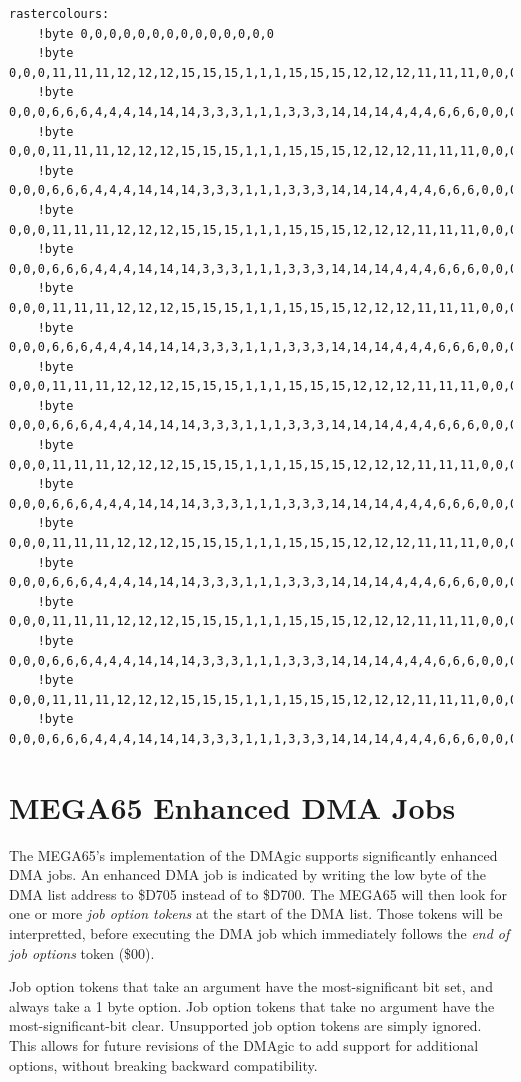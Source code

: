 \begin{tcolorbox}[colback=black,coltext=white]
\verbatimfont{\codefont}
\begin{verbatim}
rastercolours:
	!byte 0,0,0,0,0,0,0,0,0,0,0,0,0,0
	!byte 0,0,0,11,11,11,12,12,12,15,15,15,1,1,1,15,15,15,12,12,12,11,11,11,0,0,0
	!byte 0,0,0,6,6,6,4,4,4,14,14,14,3,3,3,1,1,1,3,3,3,14,14,14,4,4,4,6,6,6,0,0,0
	!byte 0,0,0,11,11,11,12,12,12,15,15,15,1,1,1,15,15,15,12,12,12,11,11,11,0,0,0
	!byte 0,0,0,6,6,6,4,4,4,14,14,14,3,3,3,1,1,1,3,3,3,14,14,14,4,4,4,6,6,6,0,0,0
	!byte 0,0,0,11,11,11,12,12,12,15,15,15,1,1,1,15,15,15,12,12,12,11,11,11,0,0,0
	!byte 0,0,0,6,6,6,4,4,4,14,14,14,3,3,3,1,1,1,3,3,3,14,14,14,4,4,4,6,6,6,0,0,0
	!byte 0,0,0,11,11,11,12,12,12,15,15,15,1,1,1,15,15,15,12,12,12,11,11,11,0,0,0
	!byte 0,0,0,6,6,6,4,4,4,14,14,14,3,3,3,1,1,1,3,3,3,14,14,14,4,4,4,6,6,6,0,0,0
	!byte 0,0,0,11,11,11,12,12,12,15,15,15,1,1,1,15,15,15,12,12,12,11,11,11,0,0,0
	!byte 0,0,0,6,6,6,4,4,4,14,14,14,3,3,3,1,1,1,3,3,3,14,14,14,4,4,4,6,6,6,0,0,0
	!byte 0,0,0,11,11,11,12,12,12,15,15,15,1,1,1,15,15,15,12,12,12,11,11,11,0,0,0
	!byte 0,0,0,6,6,6,4,4,4,14,14,14,3,3,3,1,1,1,3,3,3,14,14,14,4,4,4,6,6,6,0,0,0
	!byte 0,0,0,11,11,11,12,12,12,15,15,15,1,1,1,15,15,15,12,12,12,11,11,11,0,0,0
	!byte 0,0,0,6,6,6,4,4,4,14,14,14,3,3,3,1,1,1,3,3,3,14,14,14,4,4,4,6,6,6,0,0,0
	!byte 0,0,0,11,11,11,12,12,12,15,15,15,1,1,1,15,15,15,12,12,12,11,11,11,0,0,0
	!byte 0,0,0,6,6,6,4,4,4,14,14,14,3,3,3,1,1,1,3,3,3,14,14,14,4,4,4,6,6,6,0,0,0
	!byte 0,0,0,11,11,11,12,12,12,15,15,15,1,1,1,15,15,15,12,12,12,11,11,11,0,0,0
	!byte 0,0,0,6,6,6,4,4,4,14,14,14,3,3,3,1,1,1,3,3,3,14,14,14,4,4,4,6,6,6,0,0,0
\end{verbatim}
\end{tcolorbox}

\section{MEGA65 Enhanced DMA Jobs}

The MEGA65's implementation of the DMAgic supports significantly
enhanced DMA jobs.  An enhanced DMA job is indicated by writing the
low byte of the DMA list address to \$D705 instead of to \$D700.  The
MEGA65 will then look for one or more {\em job option tokens} at the
start of the DMA list.  Those tokens will be interpretted, before
executing the DMA job which immediately follows the {\em end of job
  options} token (\$00).

Job option tokens that take an argument have the
most-significant bit set, and always take a 1 byte option.  Job option
tokens that take no argument have the most-significant-bit clear.
Unsupported job option tokens are simply ignored.
This allows for future revisions of the DMAgic to add support for
additional options, without breaking backward compatibility.

